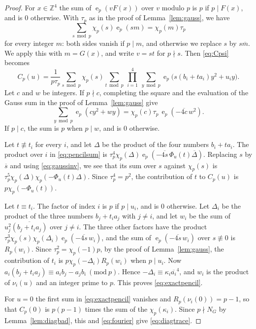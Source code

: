 \documentclass[11pt]{amsart}
\numberwithin{equation}{section}
\numberwithin{figure}{section}
\theoremstyle{definition}
\newcommand{\Z}{\mathbb{Z}}
\newcommand{\e}{\operatorname{e}}
\newcommand{\imod}[1]{\ (\mathrm{mod}\ #1)}
\begin{document}
\begin{proof}
For $x\in\Z^4$ the sum of $\e_p(vF(x))$ over $v$ modulo $p$ is $p$
if $p\mid F(x)$, and is $0$ otherwise. With $\tau_p$ as in the proof
of Lemma~\ref{lem:gauss}, we have
\begin{equation}\label{eq:gaussinv}
 \sum_{s\bmod p}\chi_p(s)\e_p(sm)=\chi_p(m)\tau_p
\end{equation}
for every integer $m$: both sides vanish if $p\mid m$, and otherwise
we replace $s$ by $s\overline m$. We apply this with $m=G(x)$, and
write $v=st$ for $p\nmid s$. Then \eqref{eq:Cpsi} becomes
\begin{equation}\label{eq:pencilsum}
 C_p(u)=\frac1{p\tau_p}\sum_{s\bmod p}\chi_p(s)\sum_{t\bmod p}\
 \prod_{i=1}^4\ \sum_{y\bmod p}\e_p\big(s(b_i+ta_i)y^2+u_iy\big).
\end{equation}
Let $c$ and $w$ be integers. If $p\nmid c$, completing the square and
the evaluation of the Gauss sum in the proof of
Lemma~\ref{lem:gauss} give
\[
 \sum_{y\bmod p}\e_p(cy^2+wy)=\chi_p(c)\tau_p\,\e_p(-\overline{4c}\,w^2).
\]
If $p\mid c$, the sum is $p$ when $p\mid w$, and is $0$ otherwise.

Let $t\not\equiv t_i$ for every $i$, and let $\Delta$ be the product
of the four numbers $b_i+ta_i$. The product over $i$ in
\eqref{eq:pencilsum} is
$\tau_p^4\chi_p(\Delta)\e_p(-\overline{4s}\,\Phi_u(t)\overline\Delta)$.
Replacing $s$ by $\overline s$ and using \eqref{eq:gaussinv}, we see
that its sum over $s$ against $\chi_p(s)$ is
$\tau_p^5\chi_p(\Delta)\chi_p(-\Phi_u(t)\Delta)$. Since
$\tau_p^4=p^2$, the contribution of $t$ to $C_p(u)$ is
$p\chi_p(-\Phi_u(t))$.

Let $t\equiv t_i$. The factor of index $i$ is $p$ if $p\mid u_i$, and
is $0$ otherwise. Let $\Delta_i$ be the product of the three numbers
$b_j+t_ia_j$ with $j\ne i$, and let $w_i$ be the sum of
$u_j^2\overline{(b_j+t_ia_j)}$ over $j\ne i$. The three other factors
have the product
$\tau_p^3\chi_p(s)\chi_p(\Delta_i)\e_p(-\overline{4s}\,w_i)$, and the
sum of $\e_p(-\overline{4s}\,w_i)$ over $s\not\equiv0$ is $R_p(w_i)$.
Since $\tau_p^2=\chi_p(-1)p$, by the proof of
Lemma~\ref{lem:gauss}, the contribution of $t_i$ is
$p\chi_p(-\Delta_i)R_p(w_i)$ when $p\mid u_i$. Now
$a_i(b_j+t_ia_j)\equiv a_ib_j-a_jb_i\imod p$. Hence
$-\Delta_i\equiv\kappa_i\overline{a_i}^4$, and $w_i$ is the product
of $\nu_i(u)$ and an integer prime to $p$. This proves
\eqref{eq:exactpencil}.

For $u=0$ the first sum in \eqref{eq:exactpencil} vanishes and
$R_p(\nu_i(0))=p-1$, so that $C_p(0)$ is $p(p-1)$ times the sum of
the $\chi_p(\kappa_i)$. Since $p\nmid N_G$ by
Lemma~\ref{lem:diagbad}, this and \eqref{eq:fourier} give
\eqref{eq:diagtrace}.


\end{proof}
\end{document}
